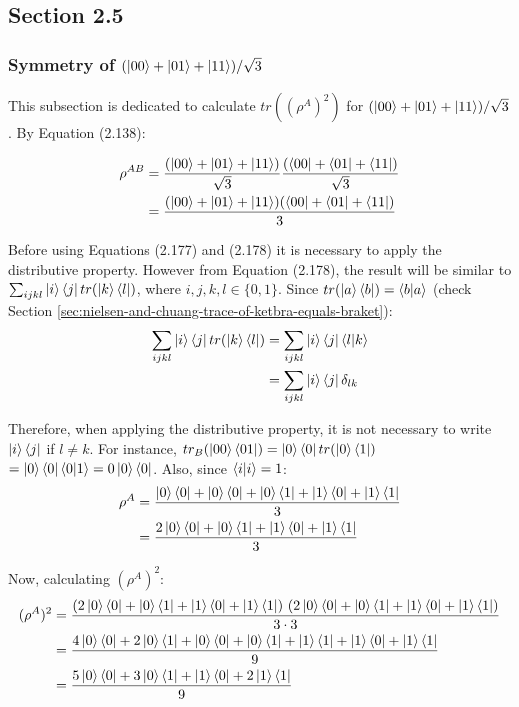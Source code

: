 \subsection{Section 2.5}
\subsubsection[Symmetry of Triple State Entanglement]
{Symmetry of $(\ket{00} + \ket{01} + \ket{11})/\sqrt{3}$}

This subsection is dedicated to calculate $tr((\rho^A)^2)$
for $(\ket{00} + \ket{01} + \ket{11})/\sqrt{3}$. By Equation (2.138):

\begin{align}
    \rho^{AB} &= \frac{(\ket{00} + \ket{01} + \ket{11})}{\sqrt{3}}
        \frac{(\bra{00} + \bra{01} + \bra{11})}{\sqrt{3}} \\
        &= \frac{(\ket{00} + \ket{01} + \ket{11})(\bra{00} + \bra{01} + \bra{11})}{3}
\end{align}

Before using Equations (2.177) and (2.178) it is necessary to apply the distributive property.
However from Equation (2.178), the result will be similar to
$\sum_{ijkl} \ket{i}\bra{j} tr(\ket{k}\bra{l})$, where $i, j, k, l \in \{0, 1\}$.
Since $tr(\ket{a}\bra{b}) = \mathop{\mathinner{ \langle{b}|{a}\rangle}}$
(check Section \ref{sec:nielsen-and-chuang-trace-of-ketbra-equals-braket}):
\begin{align}
    \sum_{ijkl} \ket{i}\bra{j} tr(\ket{k}\bra{l}) &=
        \sum_{ijkl} \ket{i}\bra{j}\mathop{\mathinner{ \langle{l}|{k}\rangle}} \\
        &= \sum_{ijkl} \ket{i}\bra{j}\delta_{lk}
\end{align}

Therefore, when applying the distributive property,
it is not necessary to write $\ket{i}\bra{j}$ if $l \neq k$.
For instance,
$tr_B(\ket{00}\bra{01}) = \ket{0}\bra{0}tr(\ket{0}\bra{1})$
$= \ket{0}\bra{0}\mathop{\mathinner{ \langle{0}|{1}\rangle}} = 0 \ket{0}\bra{0}$.
Also, since $\mathop{\mathinner{ \langle{i}|{i}\rangle}} = 1$:
\begin{align}
    \rho^A &= \frac{\ket{0}\bra{0} + \ket{0}\bra{0} + \ket{0}\bra{1} +
        \ket{1}\bra{0} + \ket{1}\bra{1}}{3} \\
    &= \frac{2\ket{0}\bra{0} + \ket{0}\bra{1} +
        \ket{1}\bra{0} + \ket{1}\bra{1}}{3}
\end{align}

Now, calculating $(\rho^A)^2$:
\begin{align}
    (\rho^A)^2 &= \frac{(2\ket{0}\bra{0} + \ket{0}\bra{1} +
        \ket{1}\bra{0} + \ket{1}\bra{1})\ (2\ket{0}\bra{0} + \ket{0}\bra{1} +
        \ket{1}\bra{0} + \ket{1}\bra{1})}{3 \cdot 3} \\
    &= \frac{4\ket{0}\bra{0} + 2\ket{0}\bra{1} + \ket{0}\bra{0} + \ket{0}\bra{1} +
        \ket{1}\bra{1} + \ket{1}\bra{0} + \ket{1}\bra{1}}{9} \\
    &= \frac{5\ket{0}\bra{0} + 3\ket{0}\bra{1} + \ket{1}\bra{0} + 2\ket{1}\bra{1}}{9}
\end{align}

